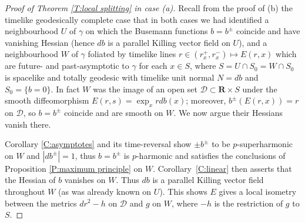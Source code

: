 \documentclass[12pt]{amsart}
\newcommand{\R}{{\mathbf R}}
\begin{document}
\begin{proof}[Proof of Theorem \ref{T:local splitting} in case (a)]
Recall from the proof of {(b) the timelike geodesically complete} case that in both cases we had identified a neighbourhood $U$ of $\gamma$ on which the Busemann functions $b=b^\pm$ coincide and have vanishing Hessian (hence $db$ is a parallel Killing vector field on $U$),
and a neighbourhood $W$ of $\gamma$
foliated by timelike lines 
$r\in (r^+_x,r^-_x) \mapsto E(r,x)$ which are future- and past-asymptotic to $\gamma$ 
for each $x \in S$,  where $S=U\cap S_0=W \cap S_0$ is spacelike and totally geodesic with timelike unit normal $N=db$ and $S_0 = \{ b=0\}$.  In fact $W$ was the image of an open set $\mathcal{D} \subset \R \times S$ under the smooth diffeomorphism $E(r,s)=\exp_x r db(x)$; moreover,  $b^\pm(E(r,x))=r$ on $\mathcal D$, so $b=b^\pm$ coincide and are smooth
on $W$.  We now argue their Hessians vanish there.

Corollary \ref{C:asymptotes} and its time-reversal
show $\pm b^\pm$ to be $p$-superharmonic on $W$ and $|db^\pm|=1$, thus $b=b^\pm$ is $p$-harmonic and satisfies the conclusions of Proposition \ref{P:maximum principle} on $W$.
Corollary~\ref{C:linear} then asserts that the Hessian of $b$ vanishes on $W$.
Thus $db$ is a parallel Killing vector field throughout $W$ (as was already known on $U$).  This shows
$E$ gives a local isometry between the metrics $dr^2 -h$ on $\mathcal{D}$ and $g$ on $W$,  where $-h$ is the restriction of $g$ to $S$.


\end{proof}
\end{document}
